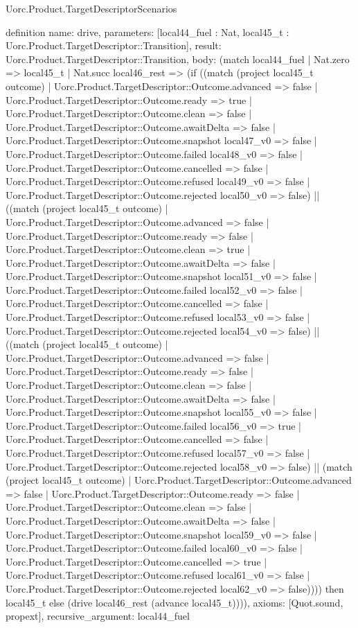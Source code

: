 \begin{lexlean}{Uorc.Product.TargetDescriptorScenarios}
\begin{semanticmodule}
definition{
  name: drive,
  parameters: [local44_fuel : Nat, local45_t : Uorc.Product.TargetDescriptor::Transition],
  result: Uorc.Product.TargetDescriptor::Transition,
  body: (match local44_fuel
    | Nat.zero => local45_t
    | Nat.succ local46_rest => (if ((match (project local45_t outcome)
      | Uorc.Product.TargetDescriptor::Outcome.advanced => false
      | Uorc.Product.TargetDescriptor::Outcome.ready => true
      | Uorc.Product.TargetDescriptor::Outcome.clean => false
      | Uorc.Product.TargetDescriptor::Outcome.awaitDelta => false
      | Uorc.Product.TargetDescriptor::Outcome.snapshot local47_v0 => false
      | Uorc.Product.TargetDescriptor::Outcome.failed local48_v0 => false
      | Uorc.Product.TargetDescriptor::Outcome.cancelled => false
      | Uorc.Product.TargetDescriptor::Outcome.refused local49_v0 => false
      | Uorc.Product.TargetDescriptor::Outcome.rejected local50_v0 => false) || ((match (project local45_t outcome)
      | Uorc.Product.TargetDescriptor::Outcome.advanced => false
      | Uorc.Product.TargetDescriptor::Outcome.ready => false
      | Uorc.Product.TargetDescriptor::Outcome.clean => true
      | Uorc.Product.TargetDescriptor::Outcome.awaitDelta => false
      | Uorc.Product.TargetDescriptor::Outcome.snapshot local51_v0 => false
      | Uorc.Product.TargetDescriptor::Outcome.failed local52_v0 => false
      | Uorc.Product.TargetDescriptor::Outcome.cancelled => false
      | Uorc.Product.TargetDescriptor::Outcome.refused local53_v0 => false
      | Uorc.Product.TargetDescriptor::Outcome.rejected local54_v0 => false) || ((match (project local45_t outcome)
      | Uorc.Product.TargetDescriptor::Outcome.advanced => false
      | Uorc.Product.TargetDescriptor::Outcome.ready => false
      | Uorc.Product.TargetDescriptor::Outcome.clean => false
      | Uorc.Product.TargetDescriptor::Outcome.awaitDelta => false
      | Uorc.Product.TargetDescriptor::Outcome.snapshot local55_v0 => false
      | Uorc.Product.TargetDescriptor::Outcome.failed local56_v0 => true
      | Uorc.Product.TargetDescriptor::Outcome.cancelled => false
      | Uorc.Product.TargetDescriptor::Outcome.refused local57_v0 => false
      | Uorc.Product.TargetDescriptor::Outcome.rejected local58_v0 => false) || (match (project local45_t outcome)
      | Uorc.Product.TargetDescriptor::Outcome.advanced => false
      | Uorc.Product.TargetDescriptor::Outcome.ready => false
      | Uorc.Product.TargetDescriptor::Outcome.clean => false
      | Uorc.Product.TargetDescriptor::Outcome.awaitDelta => false
      | Uorc.Product.TargetDescriptor::Outcome.snapshot local59_v0 => false
      | Uorc.Product.TargetDescriptor::Outcome.failed local60_v0 => false
      | Uorc.Product.TargetDescriptor::Outcome.cancelled => true
      | Uorc.Product.TargetDescriptor::Outcome.refused local61_v0 => false
      | Uorc.Product.TargetDescriptor::Outcome.rejected local62_v0 => false)))) then local45_t else (drive local46_rest (advance local45_t)))),
  axioms: [Quot.sound, propext],
  recursive_argument: local44_fuel
}


\end{semanticmodule}
\end{lexlean}
